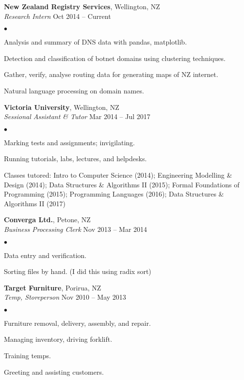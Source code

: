 \documentclass[margin,line]{res}
\newenvironment{list2}{
  \begin{list}{$\bullet$}{%
      \setlength{\itemsep}{0in}
      \setlength{\parsep}{0in} \setlength{\parskip}{0in}
      \setlength{\topsep}{0in} \setlength{\partopsep}{0in}
      \setlength{\leftmargin}{0.2in}}}
  {\end{list}}
\begin{document}
\begin{resume}
    {\bf New Zealand Registry Services}, Wellington, NZ\\
    {\em Research Intern} \hfill {Oct 2014 -- Current}
    \begin{list2}
	\item Analysis and summary of DNS data with pandas, matplotlib.
	\item Detection and classification of botnet domains using clustering techniques.
	\item Gather, verify, analyse routing data for generating maps of NZ internet.
	\item Natural language processing on domain names.
    \end{list2}

    {\bf Victoria University}, Wellington, NZ\\
    {\em Sessional Assistant \& Tutor} \hfill {Mar 2014 -- Jul 2017}
    \begin{list2}
	\item Marking tests and assignments; invigilating.
	\item Running tutorials, labs, lectures, and helpdesks.
	\item Classes tutored: Intro to Computer Science (2014); Engineering Modelling \& Design (2014); Data Structures \& Algorithms II (2015); Formal Foundations of Programming (2015); Programming Languages (2016); Data Structures \& Algorithms II (2017)
    \end{list2}

  {\bf Converga Ltd.}, Petone, NZ\\
  {\em Business Processing Clerk} \hfill {Nov 2013 -- Mar 2014}
  \begin{list2} %
	\item Data entry and verification.
	\item Sorting files by hand. (I did this using radix sort)
  \end{list2}

  {\bf Target Furniture}, Porirua, NZ\\
  {\em Temp, Storeperson} \hfill{Nov 2010 -- May 2013}
  \begin{list2} %
	\item Furniture removal, delivery, assembly, and repair. 
	\item Managing inventory, driving forklift.
	\item Training temps.
	\item Greeting and assisting customers.
  \end{list2}


\end{resume}
\end{document}
